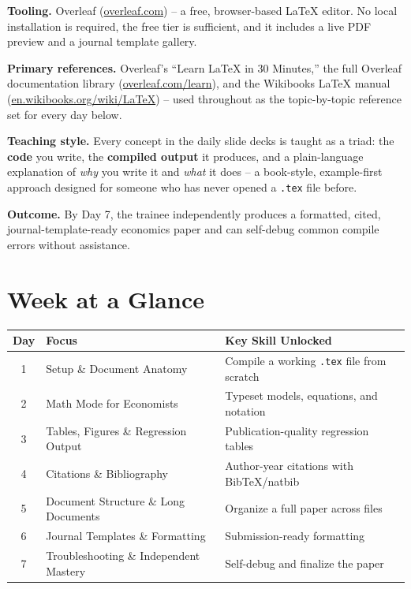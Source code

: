 \documentclass[11pt,a4paper]{article}
\begin{document}
\textbf{Tooling.} Overleaf (\url{overleaf.com}) -- a free,
browser-based LaTeX editor. No local installation is required, the
free tier is sufficient, and it includes a live PDF preview and a
journal template gallery.

\textbf{Primary references.} Overleaf's ``Learn LaTeX in 30 Minutes,''
the full Overleaf documentation library (\url{overleaf.com/learn}),
and the Wikibooks LaTeX manual (\url{en.wikibooks.org/wiki/LaTeX}) --
used throughout as the topic-by-topic reference set for every day
below.

\textbf{Teaching style.} Every concept in the daily slide decks is
taught as a triad: the \textbf{code} you write, the \textbf{compiled
output} it produces, and a plain-language explanation of \emph{why}
you write it and \emph{what} it does -- a book-style, example-first
approach designed for someone who has never opened a \texttt{.tex}
file before.

\textbf{Outcome.} By Day 7, the trainee independently produces a
formatted, cited, journal-template-ready economics paper and can
self-debug common compile errors without assistance.

\section{Week at a Glance}

\begin{center}
\begin{tabular}{clp{6cm}}
  \toprule
  \textbf{Day} & \textbf{Focus} & \textbf{Key Skill Unlocked} \\
  \midrule
  1 & Setup \& Document Anatomy & Compile a working \texttt{.tex} file from scratch \\
  2 & Math Mode for Economists & Typeset models, equations, and notation \\
  3 & Tables, Figures \& Regression Output & Publication-quality regression tables \\
  4 & Citations \& Bibliography & Author-year citations with BibTeX/natbib \\
  5 & Document Structure \& Long Documents & Organize a full paper across files \\
  6 & Journal Templates \& Formatting & Submission-ready formatting \\
  7 & Troubleshooting \& Independent Mastery & Self-debug and finalize the paper \\
  \bottomrule
\end{tabular}
\end{center}
\end{document}
